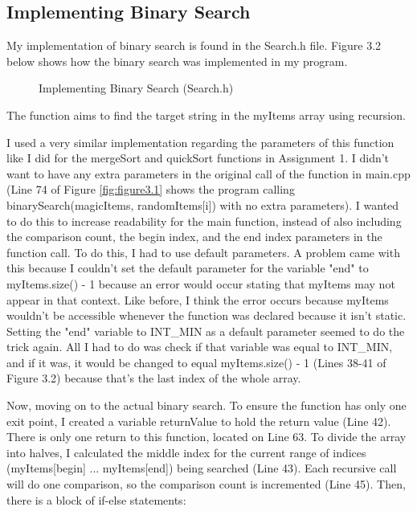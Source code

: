\documentclass[letterpaper, 10pt]{article}
\begin{document}
\subsection{Implementing Binary Search}
\noindent
My implementation of binary search is found in the Search.h file. Figure 3.2 below shows how the binary search was implemented in my program.

\begin{figure}[H]
  \centering
   
  \caption{Implementing Binary Search (Search.h)}
  \label{fig:figure3.2}
\end{figure}

\noindent
The function aims to find the target string in the myItems array using recursion. 

\vspace{1em}

\noindent
I used a very similar implementation regarding the parameters of this function like I did for the mergeSort and quickSort functions in Assignment 1. I didn't want to have any extra parameters in the original call of the function in main.cpp (Line 74 of Figure \ref{fig:figure3.1} shows the program calling binarySearch(magicItems, randomItems[i]) with no extra parameters). I wanted to do this to increase readability for the main function, instead of also including the comparison count, the begin index, and the end index parameters in the function call. To do this, I had to use default parameters. A problem came with this because I couldn't set the default parameter for the variable "end" to myItems.size() - 1 because an error would occur stating that myItems may not appear in that context. Like before, I think the error occurs because myItems wouldn't be accessible whenever the function was declared because it isn't static. Setting the "end" variable to INT\_MIN as a default parameter seemed to do the trick again. All I had to do was check if that variable was equal to INT\_MIN, and if it was, it would be changed to equal myItems.size() - 1 (Lines 38-41 of Figure 3.2) because that's the last index of the whole array.

\vspace{1em}

\noindent
Now, moving on to the actual binary search. To ensure the function has only one exit point, I created a variable returnValue to hold the return value (Line 42). There is only one return to this function, located on Line 63. To divide the array into halves, I calculated the middle index for the current range of indices (myItems[begin] ... myItems[end]) being searched (Line 43). Each recursive call will do one comparison, so the comparison count is incremented (Line 45). Then, there is a block of if-else statements:
\end{document}
